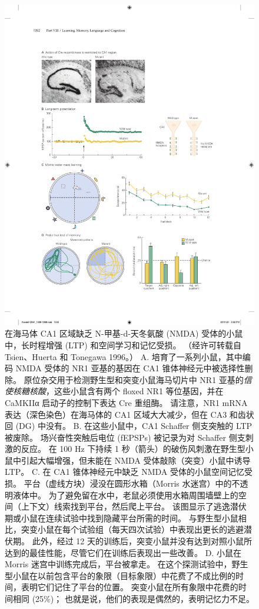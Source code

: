 \begin{figure}[htbp]
	\centering
	\includegraphics[width=0.9\linewidth]{chap54/fig_54_7}
	\caption{在海马体 CA1 区域缺乏 N-甲基-d-天冬氨酸 (NMDA) 受体的小鼠中，长时程增强 (LTP) 和空间学习和记忆受损。 （经许可转载自 Tsien、Huerta 和 Tonegawa 1996。） A. 培育了一系列小鼠，其中编码 NMDA 受体的 NR1 亚基的基因在 CA1 锥体神经元中被选择性删除。 原位杂交用于检测野生型和突变小鼠海马切片中 NR1 亚基的\textit{信使核糖核酸}，这些小鼠含有两个 floxed NR1 等位基因，并在 CaMKIIα 启动子的控制下表达 Cre 重组酶。 请注意，NR1 mRNA 表达（深色染色）在海马体的 CA1 区域大大减少，但在 CA3 和齿状回 (DG) 中没有。 B. 在这些小鼠中，CA1 Schaffer 侧支突触的 LTP 被废除。 场兴奋性突触后电位 (fEPSPs) 被记录为对 Schaffer 侧支刺激的反应。 在 100 Hz 下持续 1 秒（箭头）的破伤风刺激在野生型小鼠中引起大幅增强，但未能在 NMDA 受体敲除（突变）小鼠中诱导 LTP。 C. 在 CA1 锥体神经元中缺乏 NMDA 受体的小鼠空间记忆受损。 平台（虚线方块）浸没在圆形水箱（Morris 水迷宫）中的不透明液体中。 为了避免留在水中，老鼠必须使用水箱周围墙壁上的空间（上下文）线索找到平台，然后爬上平台。 该图显示了逃逸潜伏期或小鼠在连续试验中找到隐藏平台所需的时间。 与野生型小鼠相比，突变小鼠在每个试验组（每天四次试验）中表现出更长的逃避潜伏期。 此外，经过 12 天的训练后，突变小鼠并没有达到对照小鼠所达到的最佳性能，尽管它们在训练后表现出一些改善。 D. 小鼠在 Morris 迷宫中训练完成后，平台被拿走。 在这个探测试验中，野生型小鼠在以前包含平台的象限（目标象限）中花费了不成比例的时间，表明它们记住了平台的位置。 突变小鼠在所有象限中花费的时间相同 (25\%)； 也就是说，他们的表现是偶然的，表明记忆力不足。}
	\label{fig:54_7}
\end{figure}


